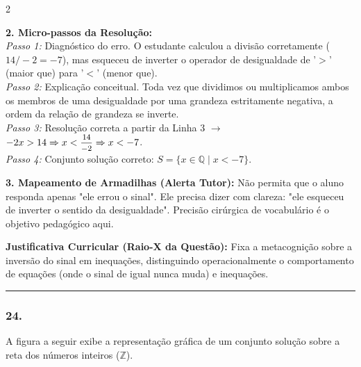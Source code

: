 \begin{multicols*}{2}
\begin{tcolorbox}[colback=CorTitUm!5, colframe=CorTitUm, boxrule=1pt, arc=4pt, left=6pt, right=6pt, top=6pt, bottom=6pt]
    \textbf{2. Micro-passos da Resolução:}\\
    \textit{Passo 1:} Diagnóstico do erro. O estudante calculou a divisão corretamente ($14 / -2 = -7$), mas esqueceu de inverter o operador de desigualdade de '$>$' (maior que) para '$<$' (menor que).\\
    \textit{Passo 2:} Explicação conceitual. Toda vez que dividimos ou multiplicamos ambos os membros de uma desigualdade por uma grandeza estritamente negativa, a ordem da relação de grandeza se inverte.\\
    \textit{Passo 3:} Resolução correta a partir da Linha 3 $\rightarrow$ $-2x > 14 \Rightarrow x < \mfrac{14}{-2} \Rightarrow x < -7$.\\
    \textit{Passo 4:} Conjunto solução correto: $S = \{x \in \mathbb{Q} \mid x < -7\}$.\par\vspace{0.1cm}
    
    \textbf{3. Mapeamento de Armadilhas (Alerta Tutor):} Não permita que o aluno responda apenas "ele errou o sinal". Ele precisa dizer com clareza: "ele esqueceu de inverter o sentido da desigualdade". Precisão cirúrgica de vocabulário é o objetivo pedagógico aqui.
    \end{tcolorbox}
    \vspace{0.15cm}
    
    \begin{boxexplicacao}
    \textbf{Justificativa Curricular (Raio-X da Questão):} Fixa a metacognição sobre a inversão do sinal em inequações, distinguindo operacionalmente o comportamento de equações (onde o sinal de igual nunca muda) e inequações.
    \end{boxexplicacao}
\fi

\par\vspace{\espacoQuestao}


\noindent\textcolor{CorLinha}{\rule{\linewidth}{0.5pt}} 
\par\vspace{\espacoPreQuestao}
\subsubsection*{24.} 
\begin{enunciadoLiteral}
A figura a seguir exibe a representação gráfica de um conjunto solução sobre a reta dos números inteiros ($\mathbb{Z}$).


\end{enunciadoLiteral}
\end{multicols*}
